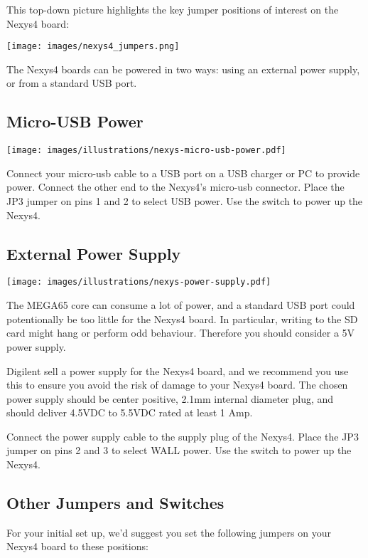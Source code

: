 This top-down picture highlights the key jumper positions of interest on the Nexys4 board:

  \begin{center}
    \texttt{[image: images/nexys4\_jumpers.png]}
  \end{center}

The Nexys4 boards can be powered in two ways: using an external power supply, or from a standard USB port.

\subsection{Micro-USB Power}

\texttt{[image: images/illustrations/nexys-micro-usb-power.pdf]}

Connect your micro-usb cable to a USB port on a USB charger or PC to provide power. Connect the other end to the Nexys4's micro-usb connector. Place the JP3 jumper on pins 1 and 2 to select USB power. Use the switch to power up the Nexys4.

\subsection{External Power Supply}

\hspace*{1.7cm}
\texttt{[image: images/illustrations/nexys-power-supply.pdf]}

The MEGA65 core can consume a lot of power, and a standard USB port could potentionally be too little for the Nexys4 board. In particular, writing to the SD card might hang or perform odd behaviour. Therefore you should consider a 5V power supply.

Digilent sell a power supply for the Nexys4 board, and we recommend you use this to ensure you avoid the risk of damage to your Nexys4 board. The chosen power supply should be center positive, 2.1mm internal diameter plug, and should deliver 4.5VDC to 5.5VDC rated at least 1 Amp.

Connect the power supply cable to the supply plug of the Nexys4. Place the JP3 jumper on pins 2 and 3 to select WALL power. Use the switch to power up the Nexys4.

\subsection{Other Jumpers and Switches}

For your initial set up, we'd suggest you set the following jumpers on your Nexys4 board to these positions:

